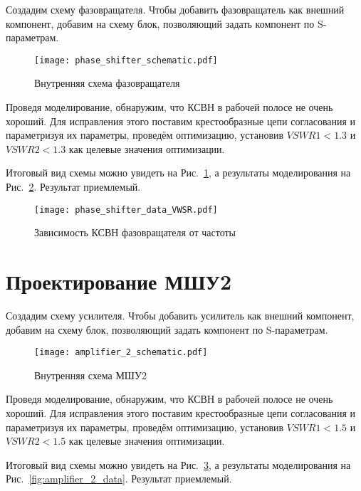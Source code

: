 Создадим схему фазовращателя.
Чтобы добавить фазовращатель как внешний компонент, добавим на схему блок, позволяющий задать компонент по S-параметрам.

\begin{figure}[!ht]
    \centering
    \texttt{[image: phase\_shifter\_schematic.pdf]}
    \caption{Внутренняя схема фазовращателя}%
    \label{fig:phase_shifter_schematic}
\end{figure}

Проведя моделирование, обнаружим, что КСВН в рабочей полосе не очень хороший.
Для исправления этого поставим крестообразные цепи согласования и параметризуя их параметры, проведём оптимизацию, установив $VSWR1 < 1.3$ и $VSWR2 < 1.3$ как целевые значения оптимизации.

Итоговый вид схемы можно увидеть на Рис.~\ref{fig:phase_shifter_schematic}, а результаты моделирования на Рис.~\ref{fig:phase_shifter_data_VWSR}.
Результат приемлемый.

\begin{figure}[!ht]
    \centering
    \texttt{[image: phase\_shifter\_data\_VWSR.pdf]}
    \caption{Зависимость КСВН фазовращателя от частоты}%
    \label{fig:phase_shifter_data_VWSR}
\end{figure}

\section{Проектирование МШУ2}

Создадим схему усилителя.
Чтобы добавить усилитель как внешний компонент, добавим на схему блок, позволяющий задать компонент по S-параметрам.

\begin{figure}[!ht]
    \centering
    \texttt{[image: amplifier\_2\_schematic.pdf]}
    \caption{Внутренняя схема МШУ2}%
    \label{fig:amplifier_2_schematic}
\end{figure}

Проведя моделирование, обнаружим, что КСВН в рабочей полосе не очень хороший.
Для исправления этого поставим крестообразные цепи согласования и параметризуя их параметры, проведём оптимизацию, установив $VSWR1 < 1.5$ и $VSWR2 < 1.5$ как целевые значения оптимизации.

Итоговый вид схемы можно увидеть на Рис.~\ref{fig:amplifier_2_schematic}, а результаты моделирования на Рис.~\ref{fig:amplifier_2_data}.
Результат приемлемый.

